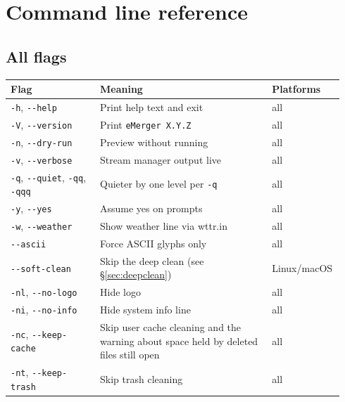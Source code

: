 \documentclass[11pt,a4paper]{article}
\begin{document}
\section{Command line reference}\label{sec:cli}

\subsection{All flags}

\begin{center}
\begin{longtable}{@{}p{0.26\linewidth} p{0.50\linewidth} p{0.18\linewidth}@{}}
\toprule
\textbf{Flag} & \textbf{Meaning} & \textbf{Platforms} \\
\midrule \endhead
\texttt{-h}, \texttt{-{}-help}             & Print help text and exit       & all \\
\texttt{-V}, \texttt{-{}-version}          & Print \texttt{eMerger X.Y.Z}   & all \\
\texttt{-n}, \texttt{-{}-dry-run}          & Preview without running        & all \\
\texttt{-v}, \texttt{-{}-verbose}          & Stream manager output live     & all \\
\texttt{-q}, \texttt{-{}-quiet}, \texttt{-qq}, \texttt{-qqq} & Quieter by one level per \texttt{-q} & all \\
\texttt{-y}, \texttt{-{}-yes}              & Assume yes on prompts          & all \\
\texttt{-w}, \texttt{-{}-weather}          & Show weather line via wttr.in  & all \\
\texttt{-{}-ascii}                      & Force ASCII glyphs only        & all \\
\texttt{-{}-soft-clean}                    & Skip the deep clean (see \S\ref{sec:deepclean}) & Linux/macOS \\
\texttt{-nl}, \texttt{-{}-no-logo}         & Hide logo                      & all \\
\texttt{-ni}, \texttt{-{}-no-info}         & Hide system info line          & all \\
\texttt{-nc}, \texttt{-{}-keep-cache}        & Skip user cache cleaning and the warning about space held by deleted files still open & all \\
\texttt{-nt}, \texttt{-{}-keep-trash}        & Skip trash cleaning            & all \\

\end{longtable}
\end{center}
\end{document}
